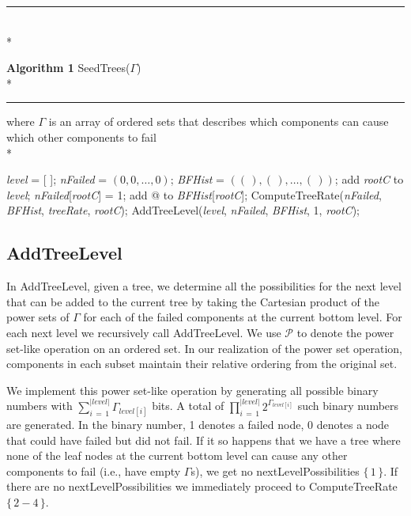 \documentclass[12pt]{article}
\newcommand{\captionAmerica}[2]{
\noindent\hspace{\fill}\rule{1.0\linewidth}{.7pt}\hspace{\fill}\vspace{-0.25em}\\*\raggedright\textbf{Algorithm #1} #2 \vspace{-0.8em}\\*\hspace{\fill}\rule{1.0\linewidth}{.7pt}\hspace{\fill}
}
\newcommand{\varName}[1]{\textrm{\it#1}}
\newcommand{\citeLine}[1]{$\{\,#1\,\}$}
\newcommand{\citeBlock}[2]{$\{\,#1 - #2\,\}$}
\begin{document}
\captionAmerica{1}{SeedTrees($\Gamma$)}
where $\Gamma$ is an array of ordered sets that describes which components can cause which other components to fail
\\*\vspace{0.8em}
\begin{algorithmic}[1]
\FOR{\varName{rootC} $\in$ \varName{compSet}}
  \STATE \varName{level} = [ ]; 
  \STATE \varName{nFailed} = $(0, 0, \ldots, 0)$; 
  \STATE \varName{BFHist} = $ ((\,), (\,), \ldots, (\,)) $; 
  \STATE add \varName{rootC} to \varName{level};
  \STATE \varName{nFailed}[\varName{rootC}] = 1;
  \STATE add @ to \varName{BFHist}[\varName{rootC}]; 
  \IF{Empty($\Gamma_{\varName{rootC}}$)}
    \STATE ComputeTreeRate(\varName{nFailed}, \varName{BFHist}, \varName{treeRate}, \varName{rootC});
  \ELSE
    \STATE AddTreeLevel(\varName{level}, \varName{nFailed}, \varName{BFHist}, 1, \varName{rootC});
  \ENDIF
\ENDFOR
\end{algorithmic}

\subsection{AddTreeLevel}

In AddTreeLevel, given a tree, we determine all the possibilities for the next level that can be added to the current tree by taking the Cartesian product of the power sets of $\Gamma$ for each of the failed components at the current bottom level. For each next level we recursively call AddTreeLevel. We use $\mathcal{P}$ to denote the power set-like operation on an ordered set. In our realization of the power set operation, components in each subset maintain their relative ordering from the original set.

We implement this power set-like operation by generating all possible binary numbers with $\sum\limits_{i\,=\,1}^{|level|}\Gamma_{level[i]}$ bits. A total of $\prod\limits_{i\,=\,1}^{|level|}2^{\Gamma_{level[i]}}$ such binary numbers are generated. In the binary number, 1 denotes a failed node, 0 denotes a node that could have failed but did not fail. If it so happens that we have a tree where none of the leaf nodes at the current bottom level can cause any other components to fail (i.e., have empty $\Gamma$s), we get no nextLevelPossibilities \citeLine{1}. If there are no nextLevelPossibilities we immediately proceed to ComputeTreeRate \citeBlock{2}{4}.
\end{document}
